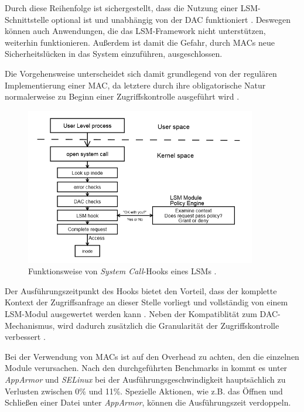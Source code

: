 \documentclass[../main.tex]{subfiles}
\begin{document}
			Durch diese Reihenfolge ist sichergestellt, dass die Nutzung einer LSM-Schnittstelle optional ist und unabhängig von der DAC funktioniert \cite{centOsMCS}. Deswegen können auch Anwendungen, die das LSM-Framework nicht unterstützen, weiterhin funktionieren. Außerdem ist damit die Gefahr, durch MACs neue Sicherheitslücken in das System einzuführen, ausgeschlossen.

			Die Vorgehensweise unterscheidet sich damit grundlegend von der regulären Implementierung einer MAC, da letztere durch ihre obligatorische Natur normalerweise zu Beginn einer Zugriffskontrolle ausgeführt wird \cite[S.3]{LSMFramework}.

			\begin{figure}[h]
					\centering
					\includegraphics[width=0.9\textwidth]{./images/sec_LSMHook.jpg}
					\caption{Funktionsweise von \emph{System Call}-Hooks eines LSMs \cite[S.3]{LSMFramework}.}
					\label{fig:sec_LSMHook}
			\end{figure}

			Der Ausführungszeitpunkt des Hooks bietet den Vorteil, dass der komplette Kontext der Zugriffsanfrage an dieser Stelle vorliegt und vollständig von einem LSM-Modul ausgewertet werden kann \cite[S.2]{LSMFramework}. Neben der Kompatiblität zum DAC-Mechanismus, wird dadurch zusätzlich die Granularität der Zugriffskontrolle verbessert \cite{LSMDesign}.

			Bei der Verwendung von MACs ist auf den Overhead zu achten, den die einzelnen Module verursachen. Nach den durchgeführten Benchmarks in \cite[S.51ff.]{SELinuxApparmor} kommt es unter \emph{AppArmor} und \emph{SELinux} bei der Ausführungsgeschwindigkeit hauptsächlich zu Verlusten zwischen 0\% und 11\%. Spezielle Aktionen, wie z.B. das Öffnen und Schließen einer Datei unter \emph{AppArmor}, können die Ausführungszeit verdoppeln.
\end{document}

